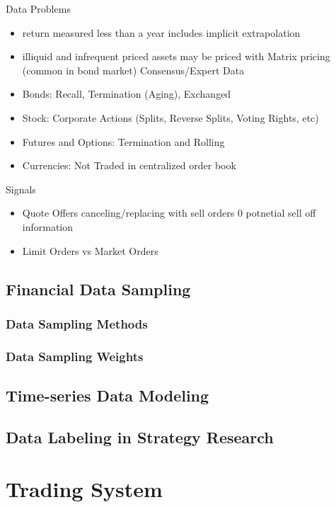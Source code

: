 \documentclass[11pt, openany]{book}              %
\begin{document}
Data Problems
\begin{itemize}
 \item return measured less than a year includes implicit extrapolation
 \item illiquid and infrequent priced assets may be priced with
 	\subitem Matrix pricing (common in bond market)
 	\subitem Consensus/Expert Data
 \item Bonds: Recall, Termination (Aging), Exchanged
 \item Stock: Corporate Actions (Splits, Reverse Splits, Voting Rights, etc)
 \item Futures and Options: Termination and Rolling
 \item Currencies: Not Traded in centralized order book 
\end{itemize}

Signals

\begin{itemize}
 \item Quote Offers canceling/replacing with sell orders 0 potnetial sell off information
 \item Limit Orders vs Market Orders 
\end{itemize}

\section{Financial Data Sampling}

\subsection{Data Sampling Methods}

\subsection{Data Sampling Weights}

\section{Time-series Data Modeling}

\section{Data Labeling in Strategy Research}




\chapter{ Trading System }
\end{document}
